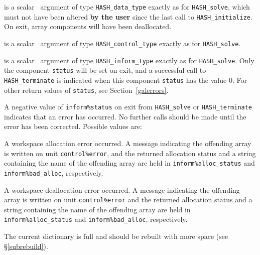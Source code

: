 \documentclass{galahad}
\newcommand{\packagename}{HASH}
\begin{document}
\vspace*{-1mm}
\begin{description}

 is a scalar \intentinout\ argument of type
{\tt \packagename\_data\_type}
exactly as for
{\tt \packagename\_solve},
which must not have been altered {\bf by the user} since the last call to
{\tt \packagename\_initialize}.
On exit, array components will have been deallocated.

 is a scalar \intentin\ argument of type
{\tt \packagename\_control\_type}
exactly as for
{\tt \packagename\_solve}.

 is a scalar \intentout\ argument of type
{\tt \packagename\_inform\_type}
exactly as for
{\tt \packagename\_solve}.
Only the component {\tt status} will be set on exit, and a
successful call to
{\tt \packagename\_terminate}
is indicated when this  component {\tt status} has the value 0.
For other return values of {\tt status}, see Section~\ref{galerrors}.

\end{description}


\galerrors
A negative value of {\tt inform\%status} on exit from
{\tt \packagename\_solve}
or
{\tt \packagename\_terminate}
indicates that an error has occurred. No further calls should be made
until the error has been corrected. Possible values are:

\begin{description}

 A workspace allocation error occurred.
A message indicating the offending
array is written on unit {\tt control\%error}, and the returned allocation
status and a string containing the name of the offending array
are held in {\tt inform\%alloc\_\-status}
and {\tt inform\%bad\_alloc}, respectively.

 A workspace deallocation error occurred.
A message indicating the offending
array is written on unit {\tt control\%error} and the returned allocation
status and a string containing the name of the offending array
are held in {\tt inform\%alloc\_\-status}
and {\tt inform\%bad\_alloc}, respectively.

 The current dictionary is full and should be rebuilt with more space
 (see \S\ref{subrebuild}).

\end{description}
\end{document}
